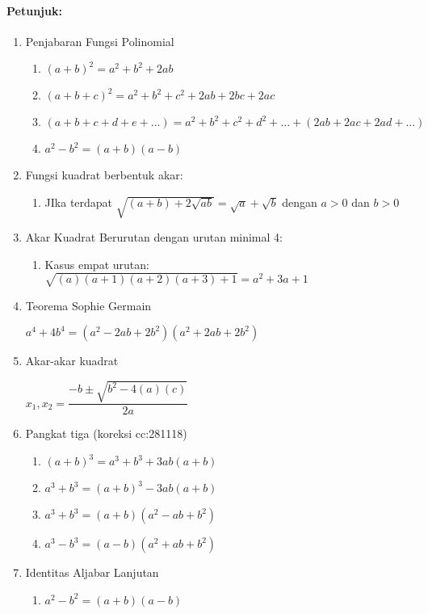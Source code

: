 		\paragraph{Petunjuk:}
		\begin{enumerate}
			\item Penjabaran Fungsi Polinomial
			\begin{enumerate}
				\item $(a+b)^2=a^2+b^2+2ab$
				\item $(a+b+c)^2=a^2+b^2+c^2+2ab+2bc+2ac$
				\item $(a+b+c+d+e+...)=a^2+b^2+c^2+d^2+...+(2ab+2ac+2ad+...)$
				\item $a^2-b^2=(a+b)(a-b)$
			\end{enumerate}	
			\item Fungsi kuadrat berbentuk akar:
			\begin{enumerate}
				\item JIka terdapat $\sqrt{(a+b)+2\sqrt{ab}}=\sqrt{a}+\sqrt{b}$ dengan $a>0$ dan $b>0$
			\end{enumerate}
			\item Akar Kuadrat Berurutan dengan urutan minimal 4:
			\begin{enumerate}
				\item Kasus empat urutan:
				$\sqrt{(a)(a+1)(a+2)(a+3)+1}=a^2+3a+1$
			\end{enumerate}
			\item Teorema Sophie Germain 
			\begin{center}
				$a^4+4b^4=(a^2-2ab+2b^2)(a^2+2ab+2b^2)$
			\end{center}
			\item Akar-akar kuadrat
			\begin{center}
				$x_1,x_2=\dfrac{-b \pm \sqrt{b^2-4(a)(c)}}{2a}$
			\end{center}
			\item Pangkat tiga (koreksi cc:281118)
				\begin{enumerate}
					\item $(a+b)^3=a^3+b^3+3ab(a+b)$
					\item $a^3+b^3=(a+b)^3-3ab(a+b)$
					\item $a^3+b^3=(a+b)(a^2-ab+b^2)$
					\item $a^3-b^3=(a-b)(a^2+ab+b^2)$
				\end{enumerate}
			\item Identitas Aljabar Lanjutan
				\begin{enumerate}
					\item $a^2-b^2=(a+b)(a-b)$

\end{enumerate}
\end{enumerate}

